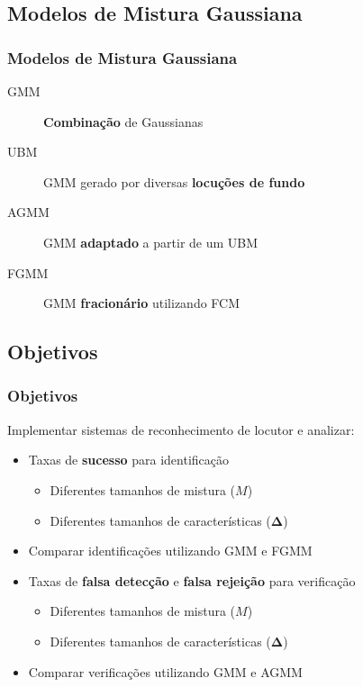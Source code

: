 \subsection{Modelos de Mistura Gaussiana}

\begin{frame}
\frametitle{Modelos de Mistura Gaussiana}
\begin{description}
    \item[GMM] \textbf{Combinação} de Gaussianas
    \item[UBM] GMM gerado por diversas \textbf{locuções de fundo}
    \item[AGMM] GMM \textbf{adaptado} a partir de um UBM
    \item[FGMM] GMM \textbf{fracionário} utilizando FCM
\end{description}
\end{frame}

\subsection{Objetivos}

\begin{frame}
\frametitle{Objetivos}
\begin{description}
    \item Implementar sistemas de reconhecimento de locutor e analizar:
    \pause
    \begin{itemize}
        \item Taxas de \textbf{sucesso} para identificação
        \begin{itemize}
            \item Diferentes tamanhos de mistura ($M$)
            \item Diferentes tamanhos de características ($\boldsymbol{\Delta}$)
            \pause
        \end{itemize}
        \item Comparar identificações utilizando GMM e FGMM
        \pause
        \item Taxas de \textbf{falsa detecção} e \textbf{falsa rejeição} para verificação
        \begin{itemize}
            \item Diferentes tamanhos de mistura ($M$)
            \item Diferentes tamanhos de características ($\boldsymbol{\Delta}$)
            \pause
        \end{itemize}
        \item Comparar verificações utilizando GMM e AGMM
    \end{itemize}
\end{description}
\end{frame}